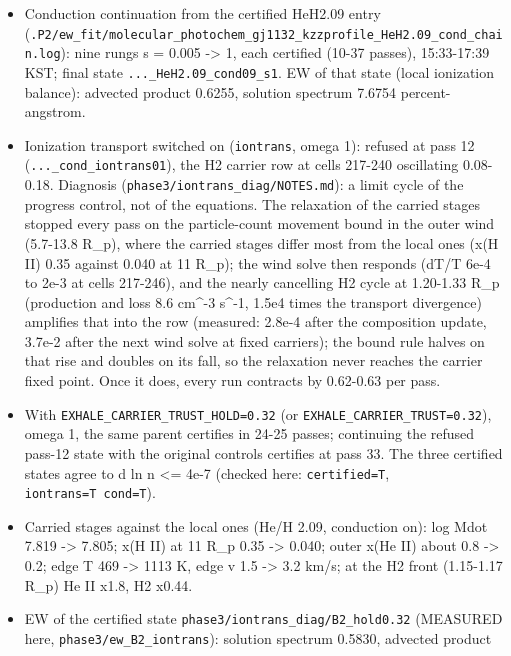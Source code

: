\documentclass[english,a4paper]{my_memo}
\providecommand{\tightlist}{\setlength{\itemsep}{0pt}\setlength{\parskip}{0pt}}
\begin{document}
\begin{itemize}
\tightlist
\item
  Conduction continuation from the certified HeH2.09 entry
  (\texttt{.P2/ew\_fit/molecular\_photochem\_gj1132\_kzzprofile\_HeH2.09\_cond\_chain.log}):
  nine rungs s = 0.005 -\textgreater{} 1, each certified (10-37 passes), 15:33-17:39 KST;
  final state \texttt{...\_HeH2.09\_cond09\_s1}. EW of that state (local ionization
  balance): advected product 0.6255, solution spectrum 7.6754
  percent-angstrom.
\item
  Ionization transport switched on (\texttt{iontrans}, omega 1): refused at pass 12
  (\texttt{...\_cond\_iontrans01}), the H2 carrier row at cells 217-240 oscillating
  0.08-0.18. Diagnosis (\texttt{phase3/iontrans\_diag/NOTES.md}): a limit cycle of
  the progress control, not of the equations. The relaxation of the carried
  stages stopped every pass on the particle-count movement bound in the
  outer wind (5.7-13.8 R\_p), where the carried stages differ most from the
  local ones (x(H II) 0.35 against 0.040 at 11 R\_p); the wind solve then
  responds (dT/T 6e-4 to 2e-3 at cells 217-246), and the nearly cancelling
  H2 cycle at 1.20-1.33 R\_p (production and loss 8.6 cm\^{}-3 s\^{}-1, 1.5e4
  times the transport divergence) amplifies that into the row (measured:
  2.8e-4 after the composition update, 3.7e-2 after the next wind solve at
  fixed carriers); the bound rule halves on that rise and doubles on its
  fall, so the relaxation never reaches the carrier fixed point. Once it
  does, every run contracts by 0.62-0.63 per pass.
\item
  With \texttt{EXHALE\_CARRIER\_TRUST\_HOLD=0.32} (or \texttt{EXHALE\_CARRIER\_TRUST=0.32}),
  omega 1, the same parent certifies in 24-25 passes; continuing the
  refused pass-12 state with the original controls certifies at pass 33.
  The three certified states agree to \textbar d ln n\textbar{} \textless= 4e-7 (checked here:
  \texttt{certified=T}, \texttt{iontrans=T\ cond=T}).
\item
  Carried stages against the local ones (He/H 2.09, conduction on): log Mdot
  7.819 -\textgreater{} 7.805; x(H II) at 11 R\_p 0.35 -\textgreater{} 0.040; outer x(He II) about 0.8
  -\textgreater{} 0.2; edge T 469 -\textgreater{} 1113 K, edge v 1.5 -\textgreater{} 3.2 km/s; at the H2 front
  (1.15-1.17 R\_p) He II x1.8, H2 x0.44.
\item
  EW of the certified state \texttt{phase3/iontrans\_diag/B2\_hold0.32} (MEASURED
  here, \texttt{phase3/ew\_B2\_iontrans}): solution spectrum 0.5830, advected product

\end{itemize}
\end{document}
